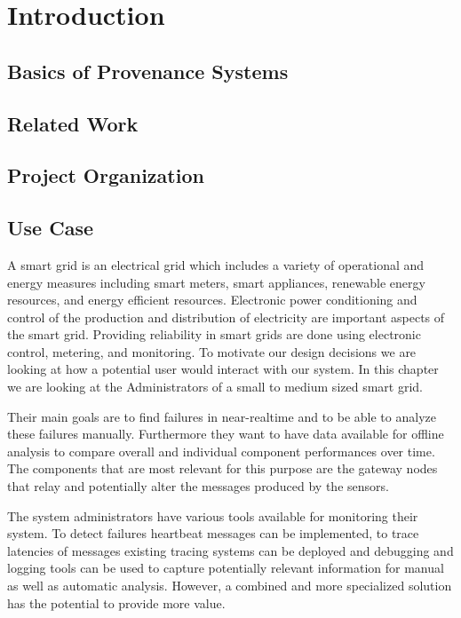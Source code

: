 \chapter{Introduction}




\section{Basics of Provenance Systems}




\section{Related Work}




\section{Project Organization}




\section{Use Case}

A smart grid is an electrical grid which includes a variety of operational and energy measures including smart meters, smart appliances, renewable energy resources, and energy efficient resources.
Electronic power conditioning and control of the production and distribution of electricity are important aspects of the smart grid. 
Providing reliability in smart grids are done using electronic control, metering, and monitoring. 
To motivate our design decisions we are looking at how a potential user would interact with our system. 
In this chapter we are looking at the Administrators of a small to medium sized smart grid. 

Their main goals are to find failures in near-realtime and to be able to analyze these failures manually. 
Furthermore they want to have data available for offline analysis to compare overall and individual component performances over time. 
The components that are most relevant for this purpose are the gateway nodes that relay and potentially alter the messages produced by the sensors.

\vspace{3mm}

The system administrators have various tools available for monitoring their system. 
To detect failures heartbeat messages can be implemented, to trace latencies of messages existing tracing systems can be deployed and debugging and logging tools can be used to capture potentially relevant information for manual as well as automatic analysis.
However, a combined and more specialized solution has the potential to provide more value.

